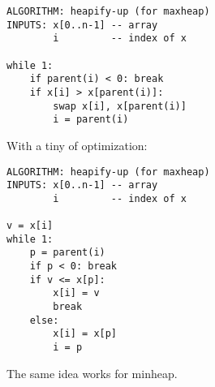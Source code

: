 \begin{Verbatim}[frame=single]
ALGORITHM: heapify-up (for maxheap)
INPUTS: x[0..n-1] -- array
        i         -- index of x

while 1:
    if parent(i) < 0: break
    if x[i] > x[parent(i)]:
        swap x[i], x[parent(i)]
        i = parent(i)
\end{Verbatim}

With a tiny of optimization:
\begin{Verbatim}[frame=single]
ALGORITHM: heapify-up (for maxheap)
INPUTS: x[0..n-1] -- array
        i         -- index of x

v = x[i]
while 1:
    p = parent(i)
    if p < 0: break
    if v <= x[p]:
        x[i] = v
        break
    else:
        x[i] = x[p]
        i = p
\end{Verbatim}

The same idea works for minheap.
